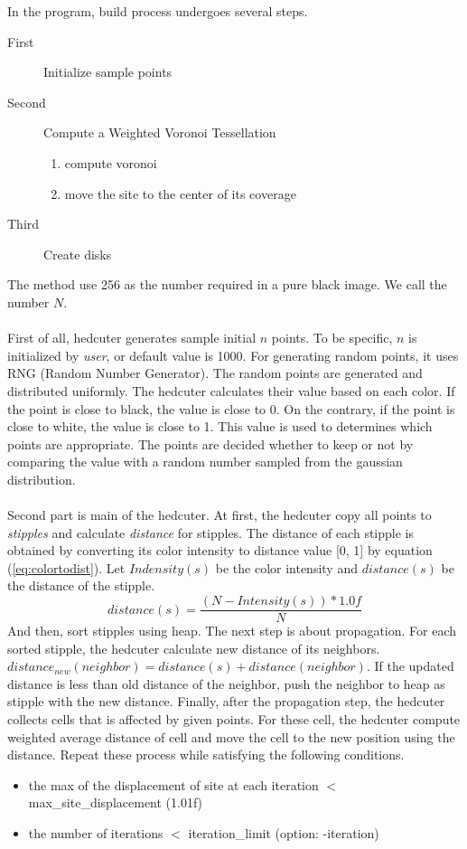 \documentclass[11pt]{article}
\begin{document}
\clearpage
In the program, build process undergoes several steps. 
\begin{description}
  \item[First] Initialize sample points
  \item[Second] Compute a Weighted Voronoi Tessellation
	\begin{enumerate}
	  \item compute voronoi
	  \item move the site to the center of its coverage
	\end{enumerate}
  \item[Third] Create disks
\end{description}
The method use 256 as the number required in a pure black image. We call the number $N$.
\\ \\
First of all, hedcuter generates sample initial $n$ points. To be specific, $n$ is initialized by \textit{user}, or default value is 1000. For generating random points, it uses RNG (Random Number Generator). The random points are generated and distributed uniformly. The hedcuter calculates their value based on each color. If the point is close to black, the value is close to 0. On the contrary, if the point is close to white, the value is close to 1. This value is used to determines which points are appropriate. The points are decided whether to keep or not by comparing the value with a random number sampled from the gaussian distribution. 
\\ \\
Second part is main of the hedcuter. At first, the hedcuter copy all points to \textit{stipples} and calculate \textit{distance} for stipples. The distance of each stipple is obtained by converting its color intensity to distance value [0, 1] by equation (\ref{eq:colortodist}). Let $Indensity(s)$ be the color intensity and $distance(s)$ be the distance of the stipple.
\begin{equation}
distance(s) = \frac{\left(N-Intensity\left(s\right)\right)*1.0f}{N}
\label{eq:colortodist}
\end{equation}
And then, sort stipples using heap. The next step is about propagation. For each sorted stipple, the hedcuter calculate new distance of its neighbors. $distance_{new}(neighbor) = distance(s) + distance(neighbor)$. If the updated distance is less than old distance of the neighbor, push the neighbor to heap as stipple with the new distance. Finally, after the propagation step, the hedcuter collects cells that is affected by given points. For these cell, the hedcuter compute weighted average distance of cell and move the cell to the new position using the distance. Repeat these process while satisfying the following conditions.
\begin{itemize}
  \item the max of the displacement of site at each iteration  $<$ max\_site\_displacement (1.01f)
  \item the number of iterations $<$ iteration\_limit (option: -iteration)
\end{itemize}
\end{document}
